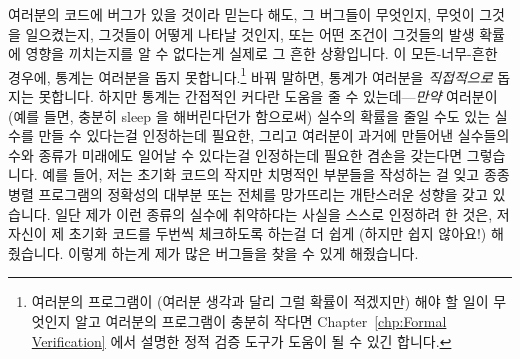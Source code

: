 여러분의 코드에 버그가 있을 것이라 믿는다 해도, 그 버그들이 무엇인지, 무엇이
그것을 일으켰는지, 그것들이 어떻게 나타날 것인지, 또는 어떤 조건이 그것들의
발생 확률에 영향을 끼치는지를 알 수 없다는게 실제로 그 흔한 상황입니다.
이 모든-너무-흔한 경우에, 통계는 여러분을 돕지 못합니다.\footnote{
	여러분의 프로그램이 (여러분 생각과 달리 그럴 확률이 적겠지만) 해야 할
	일이 무엇인지 알고 여러분의 프로그램이 충분히 작다면
	Chapter~\ref{chp:Formal Verification} 에서 설명한 정적 검증 도구가
	도움이 될 수 있긴 합니다.}
바꿔 말하면, 통계가 여러분을 \emph{직접적으로} 돕지는 못합니다.
하지만 통계는 간접적인 커다란 도움을 줄 수 있는데---\emph{만약} 여러분이 (예를
들면, 충분히 sleep 을 해버린다던가 함으로써) 실수의 확률을 줄일 수도 있는
실수를 만들 수 있다는걸 인정하는데 필요한, 그리고 여러분이 과거에 만들어낸
실수들의 수와 종류가 미래에도 일어날 수 있다는걸 인정하는데 필요한 겸손을
갖는다면 그렇습니다.
예를 들어, 저는 초기화 코드의 작지만 치명적인 부분들을 작성하는 걸 잊고 종종
병렬 프로그램의 정확성의 대부분 또는 전체를 망가뜨리는 개탄스러운 성향을 갖고
있습니다.
일단 제가 이런 종류의 실수에 취약하다는 사실을 스스로 인정하려 한 것은, 저
자신이 제 초기화 코드를 두번씩 체크하도록 하는걸 더 쉽게 (하지만 쉽지 않아요!)
해줬습니다.
이렇게 하는게 제가 많은 버그들을 찾을 수 있게 해줬습니다.

